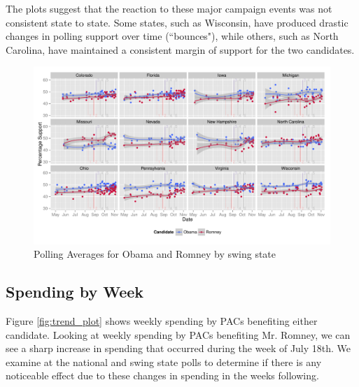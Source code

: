 \documentclass[11pt]{article}\usepackage{graphicx, color}
\newenvironment{knitrout}{}{} %
\begin{document}
The plots suggest that the reaction to these major campaign events was not consistent state to state. Some states, such as Wisconsin, have produced drastic changes in polling support over time (``bounces"), while others, such as North Carolina, have maintained a consistent margin of support for the two candidates.

\begin{knitrout}
\color{fgcolor}\begin{figure}[H]


{\centering \includegraphics[width=\textwidth]{figure/type_swing_1} 

}

\caption[Polling Averages for Obama and Romney by swing state]{Polling Averages for Obama and Romney by swing state\label{fig:type_swing_1}}
\end{figure}

\end{knitrout}



\subsection{Spending by Week}

Figure \ref{fig:trend_plot} shows weekly spending by PACs benefiting either candidate. Looking at weekly spending by PACs benefiting Mr. Romney, we can see a sharp increase in spending that occurred during the week of July 18th. We examine at the national and swing state polls to determine if there is any noticeable effect due to these changes in spending in the weeks following.
\end{document}
